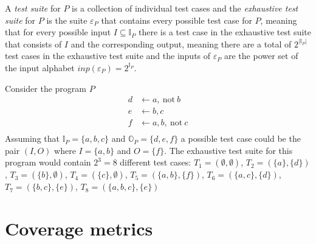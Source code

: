 A \emph{test suite} for $P$ is a collection of individual test cases and the \emph{exhaustive test suite} for $P$ is the suite \(\varepsilon_P\) that contains every possible test case for $P$, meaning that for every possible input \(I \subseteq \mathbb{I}_P\) there is a test case in the exhaustive test suite that consists of $I$ and the corresponding output, meaning there are a total of \(2^{|\mathbb{I}_P|}\) test cases in the exhaustive test suite and the inputs of $\varepsilon_P$ are the power set of the input alphabet \(inp(\varepsilon_P) = 2^{\mathbb{I}_P}\).

\begin{example}
\label{ex:test suite}
    Consider the program $P$
    \begin{align*}
        d &\leftarrow a,\ \text{not}\ b \\
        e &\leftarrow b, c \\
        f &\leftarrow a, b,\ \text{not}\ c \\
    \end{align*}
    Assuming that \(\mathbb{I}_P = \{a, b, c\}\) and \(\mathbb{O}_P = \{d, e, f\}\) a possible test case could be the pair \((I, O)\) where \(I = \{a, b\}\) and \(O = \{f\}\).
    The exhaustive test suite for this program would contain \(2^3 = 8\) different test cases: \(T_1 = (\emptyset, \emptyset)\), \(T_2 = (\{a\}, \{d\})\), \(T_3 
 = (\{b\}, \emptyset)\), \(T_4 = (\{c\}, \emptyset)\), \(T_5 = (\{a, b\}, \{f\})\), \(T_6 = (\{a, c\}, \{d\})\), \(T_7 = (\{b, c\}, \{e\})\), \(T_8 = (\{a, b, c\}, \{e\})\)
\end{example}

\chapter{Coverage metrics}
\label{ch:Coverage metrics}


